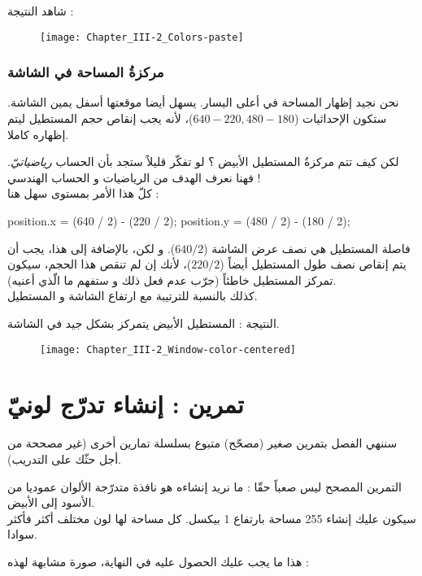 شاهد النتيجة :

\begin{figure}[H]
	\centering
	\texttt{[image: Chapter\_III-2\_Colors-paste]}
\end{figure}

\subsubsection{مركزةُ المساحة في الشاشة}

نحن نجيد إظهار المساحة في أعلى اليسار. يسهل أيضا موقعتها أسفل يمين الشاشة. ستكون الإحداثيات
\mbox{($640 - 220, 480 - 180$)}،
لأنه يجب إنقاص حجم المستطيل ليتم إظهاره كاملا. 

لكن كيف تتم مركزةُ المستطيل الأبيض ؟ لو تفكّر قليلاً ستجد بأن الحساب
\textit{رياضياتيّ}.
فهنا نعرف الهدف من الرياضيات و الحساب الهندسي !\\
كلّ هذا الأمر بمستوى سهل هنا :

\begin{Csource}
position.x = (640 / 2) - (220 / 2);
position.y = (480 / 2) - (180 / 2);
\end{Csource}

فاصلة المستطيل هي نصف عرض الشاشة
($640 / 2$).
و لكن، بالإضافة إلى هذا، يجب أن يتم إنقاص نصف طول المستطيل أيضاً 
($220 / 2$)،
لأنك إن لم تنقص هذا الحجم، سيكون تمركز المستطيل خاطئاً (جرّب عدم فعل ذلك و ستفهم ما الّذي أعنيه).\\
كذلك بالنسبة للترتيبة مع ارتفاع الشاشة و المستطيل.

النتيجة : المستطيل الأبيض يتمركز بشكل جيد في الشاشة.

\begin{figure}[H]
	\centering
	\texttt{[image: Chapter\_III-2\_Window-color-centered]}
\end{figure}

\section{تمرين : إنشاء تدرّج لونيّ}

سننهي الفصل بتمرين صغير (مصحّح) متبوع بسلسلة تمارين أخرى (غير مصححة من أجل حثّك على التدريب).

التمرين المصحح ليس صعباً حقّا : ما نريد إنشاءه هو نافذة متدرّجة الألوان عموديا من الأسود إلى الأبيض.\\
سيكون عليك إنشاء 255 مساحة بارتفاع 1 بيكسل. كل مساحة لها لون مختلف أكثر فأكثر سوادا.

هذا ما يجب عليك الحصول عليه في النهاية، صورة مشابهة لهذه :

